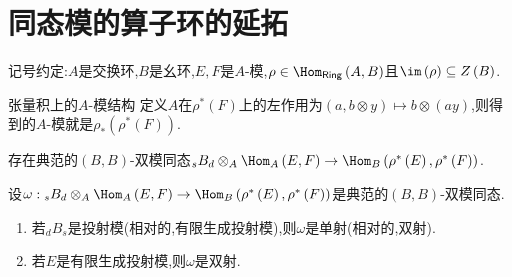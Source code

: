\section{同态模的算子环的延拓}

记号约定:$A$是交换环,$B$是幺环,$E,F$是$A$-模,$\rho\in\Hom_{\mathsf{Ring}}\left(A,B\right)$且$\im\left(\rho\right)\subseteq Z\left(B\right)$.

\begin{proposition}{张量积上的$A$-模结构}{}
	定义$A$在$\rho^{\ast}\left(F\right)$上的左作用为$\left(a,b\otimes y\right)\mapsto b\otimes\left(ay\right)$,则得到的$A$-模就是$\rho_{\ast}\left(\rho^{\ast}\left(F\right)\right)$.
\end{proposition}

\begin{proposition}{}{}
	存在典范的$\left(B,B\right)$-双模同态${}_{s}B_{d}\otimes_{A}\Hom_{A}\left(E,F\right)\to\Hom_{B}\left(\rho^{\ast}\left(E\right),\rho^{\ast}\left(F\right)\right)$.
\end{proposition}

\begin{proposition}{}{}
	设$\omega:{}_{s}B_{d}\otimes_{A}\Hom_{A}\left(E,F\right)\to\Hom_{B}\left(\rho^{\ast}\left(E\right),\rho^{\ast}\left(F\right)\right)$是典范的$\left(B,B\right)$-双模同态.
	\begin{enumerate}
		\item 若$_{d}B_{s}$是投射模(相对的,有限生成投射模),则$\omega$是单射(相对的,双射).
		\item 若$E$是有限生成投射模,则$\omega$是双射.
	\end{enumerate}
\end{proposition}
